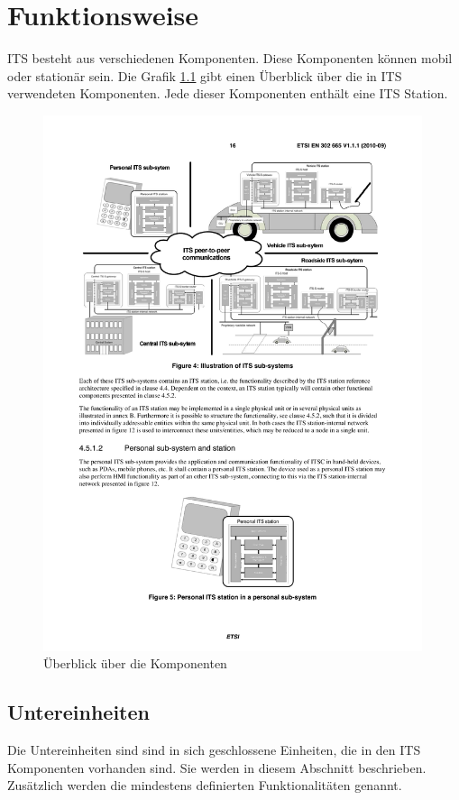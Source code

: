 \chapter{Funktionsweise \label{chap_funktionsweise}}
\ac{ITS} besteht aus verschiedenen Komponenten. Diese Komponenten können mobil oder stationär sein. Die Grafik \ref{fig:funktionsweise_komponentenueberblick} gibt einen Überblick über die in \ac{ITS} verwendeten Komponenten. Jede dieser Komponenten enthält eine \ac{ITS} Station.

\begin{figure}
\includegraphics[width=0.99\textwidth]{content/images/01_funktionsweise/ueberblick-ITS-subsystems.pdf}
\caption{Überblick über die Komponenten \cite{etsi2010302}}
\label{fig:funktionsweise_komponentenueberblick}
\end{figure}

\section{Untereinheiten}
Die Untereinheiten sind sind in sich geschlossene Einheiten, die in den \ac{ITS} Komponenten vorhanden sind. Sie werden in diesem Abschnitt beschrieben. Zusätzlich werden die mindestens definierten Funktionalitäten genannt.
  
